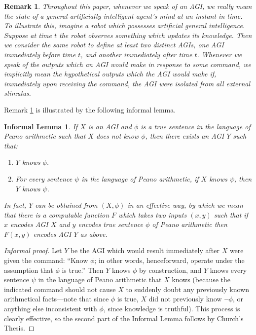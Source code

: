 \documentclass{article}
\newtheorem{informallemma}[theorem]{Informal Lemma}
\newtheorem{remark}[theorem]{Remark}
\begin{document}
\begin{remark}
\label{temporalremark}
    Throughout this paper, whenever we speak of an AGI, we really mean the
    state of a general-artificially intelligent agent's mind at an instant in time.
    To illustrate this, imagine a robot which possesses artificial general intelligence.
    Suppose at time $t$ the robot observes something which updates its knowledge.
    Then we consider the same robot to define at least two distinct AGIs, one AGI
    immediately before time $t$, and another
    immediately after time $t$.
    Whenever we speak of the outputs which an AGI would make in response to some
    command, we implicitly mean the hypothetical outputs which the AGI would make
    if, immediately upon receiving the command, the AGI were isolated from all
    external stimulus.
\end{remark}

Remark \ref{temporalremark} is illustrated by the following
informal lemma.

\begin{informallemma}
\label{teachinglemma}
    If $X$ is an AGI and $\phi$ is a true sentence in the language of Peano arithmetic
    such that $X$ does not know $\phi$, then there exists an AGI $Y$ such that:
    \begin{enumerate}
        \item
        $Y$ knows $\phi$.
        \item
        For every sentence $\psi$ in the language of Peano arithmetic,
        if $X$ knows $\psi$, then $Y$ knows $\psi$.
    \end{enumerate}
    In fact, $Y$ can be obtained from $(X,\phi)$ in an effective way, by which we mean
    that there is a computable function $F$ which takes two inputs $(x,y)$ such that
    if $x$ encodes AGI $X$ and $y$ encodes true sentence $\phi$ of Peano arithmetic
    then $F(x,y)$ encodes AGI $Y$ as above.
\end{informallemma}

\begin{proof}[Informal proof]
    Let $Y$ be the AGI which would result immediately after $X$ were given the command:
    ``Know $\phi$; in other words, henceforward, operate under the assumption
    that $\phi$ is true.'' Then $Y$ knows $\phi$ by construction, and $Y$ knows
    every sentence $\psi$ in the language of Peano arithmetic that $X$ knows
    (because the indicated command should not cause $X$ to suddenly doubt any
    previously known arithmetical facts---note that since $\phi$ is true, $X$
    did not previously know $\neg\phi$, or anything else inconsistent with $\phi$,
    since knowledge is truthful). This process is clearly effective, so the second
    part of the Informal Lemma follows by Church's Thesis.
\end{proof}
\end{document}
